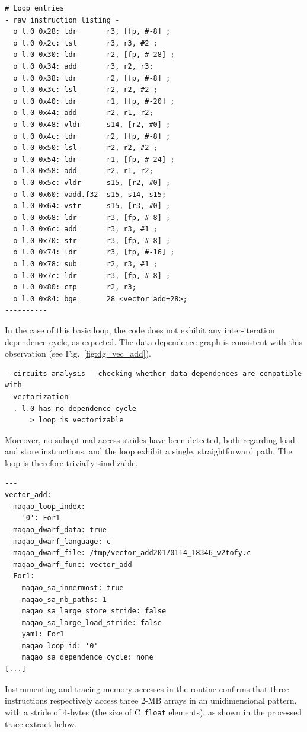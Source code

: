 \documentclass[11pt, a4paper, twoside]{montblanc2}
\begin{document}
\begin{verbatim}
# Loop entries
- raw instruction listing -
  o l.0 0x28: ldr       r3, [fp, #-8] ;
  o l.0 0x2c: lsl       r3, r3, #2 ;
  o l.0 0x30: ldr       r2, [fp, #-28] ;
  o l.0 0x34: add       r3, r2, r3;
  o l.0 0x38: ldr       r2, [fp, #-8] ;
  o l.0 0x3c: lsl       r2, r2, #2 ;
  o l.0 0x40: ldr       r1, [fp, #-20] ;
  o l.0 0x44: add       r2, r1, r2;
  o l.0 0x48: vldr      s14, [r2, #0] ;
  o l.0 0x4c: ldr       r2, [fp, #-8] ;
  o l.0 0x50: lsl       r2, r2, #2 ;
  o l.0 0x54: ldr       r1, [fp, #-24] ;
  o l.0 0x58: add       r2, r1, r2;
  o l.0 0x5c: vldr      s15, [r2, #0] ;
  o l.0 0x60: vadd.f32  s15, s14, s15;
  o l.0 0x64: vstr      s15, [r3, #0] ;
  o l.0 0x68: ldr       r3, [fp, #-8] ;
  o l.0 0x6c: add       r3, r3, #1 ;
  o l.0 0x70: str       r3, [fp, #-8] ;
  o l.0 0x74: ldr       r3, [fp, #-16] ;
  o l.0 0x78: sub       r2, r3, #1 ;
  o l.0 0x7c: ldr       r3, [fp, #-8] ;
  o l.0 0x80: cmp       r2, r3;
  o l.0 0x84: bge       28 <vector_add+28>;
----------
\end{verbatim}

In the case of this basic loop, the code does not exhibit any inter-iteration 
dependence cycle, as expected. The data dependence graph is consistent with this 
observation (see Fig.~\ref{fig:dg_vec_add}).

\begin{verbatim}
- circuits analysis - checking whether data dependences are compatible with 
  vectorization
  . l.0 has no dependence cycle
      > loop is vectorizable
\end{verbatim}

Moreover, no suboptimal access strides have been detected, both regarding load 
and store instructions, and the loop exhibit a single, straightforward path. The 
loop is therefore trivially simdizable.

\begin{verbatim}
---
vector_add:
  maqao_loop_index:
    '0': For1
  maqao_dwarf_data: true
  maqao_dwarf_language: c
  maqao_dwarf_file: /tmp/vector_add20170114_18346_w2tofy.c
  maqao_dwarf_func: vector_add
  For1:
    maqao_sa_innermost: true
    maqao_sa_nb_paths: 1
    maqao_sa_large_store_stride: false
    maqao_sa_large_load_stride: false
    yaml: For1
    maqao_loop_id: '0'
    maqao_sa_dependence_cycle: none
[...]
\end{verbatim}

Instrumenting and tracing memory accesses in the routine confirms that three 
instructions respectively access three 2-MB arrays in an unidimensional pattern,
with a stride of 4-bytes (the size of C~\texttt{float} elements), as shown in 
the processed trace extract below.
\end{document}
